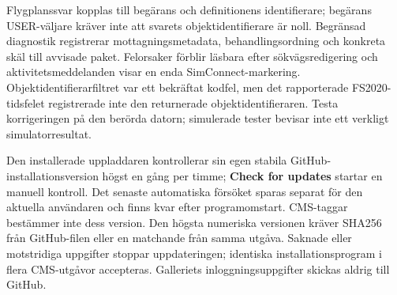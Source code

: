 \documentclass[11pt,a4paper]{article}
\newcommand{\filepath}[1]{\path{#1}}
\newcommand{\ui}[1]{\textbf{#1}}
\begin{document}
Flygplanssvar kopplas till begärans och definitionens identifierare; begärans
USER-väljare kräver inte att svarets objektidentifierare är noll. Begränsad
diagnostik registrerar mottagningsmetadata, behandlingsordning och konkreta skäl
till avvisade paket. Felorsaker förblir läsbara efter sökvägsredigering och
aktivitetsmeddelanden visar en enda SimConnect-markering.
Objektidentifierarfiltret var ett bekräftat kodfel, men det rapporterade
FS2020-tidsfelet registrerade inte den returnerade objektidentifieraren. Testa
korrigeringen på den berörda datorn; simulerade tester bevisar inte ett verkligt
simulatorresultat.

Den installerade uppladdaren kontrollerar sin egen stabila
GitHub-installationsversion högst en gång per timme; \ui{Check for updates}
startar en manuell kontroll. Det senaste automatiska försöket sparas separat för
den aktuella användaren och finns kvar efter programomstart. CMS-taggar
bestämmer inte dess version. Den högsta numeriska versionen kräver SHA256 från
GitHub-filen eller en matchande \filepath{winapp-update.json} från samma utgåva.
Saknade eller motstridiga uppgifter stoppar uppdateringen; identiska
installationsprogram i flera CMS-utgåvor accepteras. Galleriets
inloggningsuppgifter skickas aldrig till GitHub.
\end{document}
